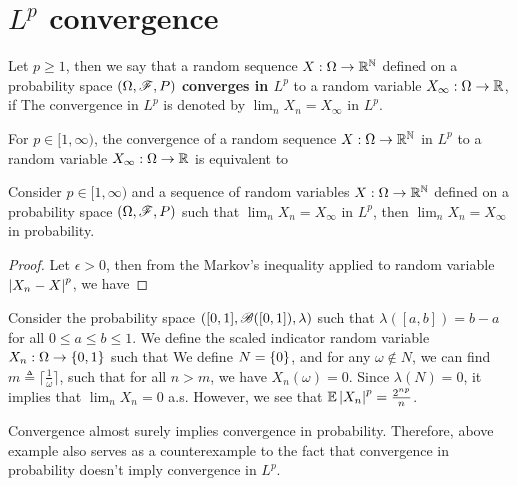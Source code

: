 \documentclass[letterpaper,10pt,english]{article}
\begin{document}
\section{$L^p$ convergence}
\begin{defn}[Convergence in $L^p$] 
Let $p \ge 1$, 
then we say that a random sequence $X: \Omega \to \mathbb{R}^{\mathbb{N}}$ defined on a probability space $(\Omega,\mathscr{F},P)$ \textbf{converges in $L^p$} to a random variable $X_\infty:\Omega \to \mathbb{R}$, 
if 
The convergence in $L^p$ is denoted by $\lim_nX_n = X_\infty$ in $L^p$. 
\end{defn}
\begin{rem}
For $p \in [1, \infty)$, the convergence of a random sequence $X: \Omega\to\mathbb{R}^{\mathbb{N}}$ in $L^p$  to a random variable $X_\infty:\Omega \to \mathbb{R}$ is equivalent to 
\end{rem}
\begin{prop} 
Consider $p \in [1, \infty)$ and a sequence of random variables $X:\Omega\to\mathbb{R}^{\mathbb{N}}$ defined on a probability space $(\Omega,\mathscr{F}, P)$ such that $\lim_nX_n = X_\infty$ in $L^p$, then $\lim_nX_n = X_\infty$ in probability.
\end{prop}
\begin{proof}
Let $\epsilon > 0$, then from the Markov's inequality applied to random variable $\left\lvert X_n-X\right\rvert^p$, we have
\end{proof}
\begin{shaded*}
\begin{exmp} 
Consider the probability space $([0,1], \mathscr{B}([0,1]), \lambda)$ such that $\lambda([a,b]) = b-a$ for all $0 \le a \le b \le 1$. 
We define the scaled indicator random variable $X_n: \Omega \to \left\{0,1\right\}$ such that
We define $N = \left\{0\right\}$, 
and for any $\omega \notin N$, we can find $m \triangleq \lceil \frac{1}{\omega}\rceil$, 
such that for all $n > m$, we have $X_n(\omega) = 0$. 
Since $\lambda(N) = 0$, it implies that $\lim_nX_n = 0$ a.s. 
However, we see that $\mathbb{E}\left\lvert X_n\right\rvert^p = \frac{2^{np}}{n}$. 
\end{exmp}
\end{shaded*}
\begin{rem}
Convergence almost surely implies convergence in probability. 
Therefore, above example also serves as a counterexample to the fact that convergence in probability doesn't imply convergence in $L^p$.
\end{rem}
\end{document}
